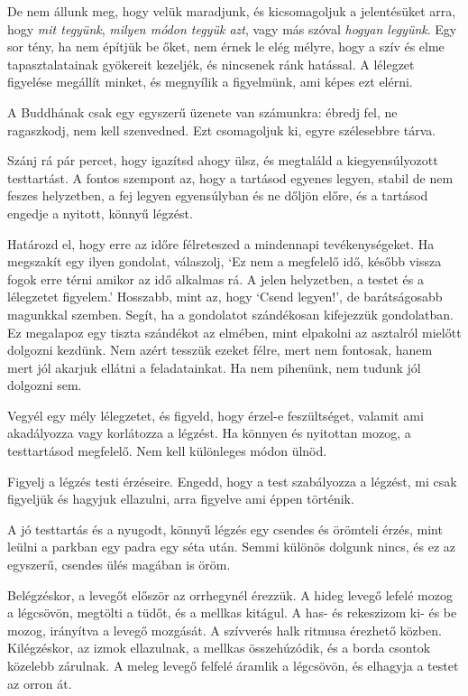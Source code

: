 De nem állunk meg, hogy velük maradjunk, és kicsomagoljuk a jelentésüket
arra, hogy \emph{mit tegyünk}, \emph{milyen módon tegyük azt}, vagy más
szóval \emph{hogyan legyünk}. Egy sor tény, ha nem építjük be őket, nem
érnek le elég mélyre, hogy a szív és elme tapasztalatainak gyökereit
kezeljék, és nincsenek ránk hatással. A lélegzet figyelése megállít
minket, és megnyílik a figyelmünk, ami képes ezt elérni.

A Buddhának csak egy egyszerű üzenete van számunkra: ébredj fel, ne
ragaszkodj, nem kell szenvedned. Ezt csomagoljuk ki, egyre szélesebbre
tárva.

Szánj rá pár percet, hogy igazítsd ahogy ülsz, és megtaláld a
kiegyensúlyozott testtartást. A fontos szempont az, hogy a tartásod
egyenes legyen, stabil de nem feszes helyzetben, a fej legyen
egyensúlyban és ne dőljön előre, és a tartásod engedje a nyitott, könnyű
légzést.

Határozd el, hogy erre az időre félreteszed a mindennapi
tevékenységeket. Ha megszakít egy ilyen gondolat, válaszolj, `Ez nem a
megfelelő idő, később vissza fogok erre térni amikor az idő alkalmas rá.
A jelen helyzetben, a testet és a lélegzetet figyelem.' Hosszabb, mint
az, hogy `Csend legyen!', de barátságosabb magunkkal szemben. Segít, ha
a gondolatot szándékosan kifejezzük gondolatban. Ez megalapoz egy tiszta
szándékot az elmében, mint elpakolni az asztalról mielőtt dolgozni
kezdünk. Nem azért tesszük ezeket félre, mert nem fontosak, hanem mert
jól akarjuk ellátni a feladatainkat. Ha nem pihenünk, nem tudunk jól
dolgozni sem.

Vegyél egy mély lélegzetet, és figyeld, hogy érzel-e feszültséget,
valamit ami akadályozza vagy korlátozza a légzést. Ha könnyen és
nyitottan mozog, a testtartásod megfelelő. Nem kell különleges módon
ülnöd.

Figyelj a légzés testi érzéseire. Engedd, hogy a test szabályozza a
légzést, mi csak figyeljük és hagyjuk ellazulni, arra figyelve ami éppen
történik.

A jó testtartás és a nyugodt, könnyű légzés egy csendes és örömteli
érzés, mint leülni a parkban egy padra egy séta után. Semmi különös
dolgunk nincs, és ez az egyszerű, csendes ülés magában is öröm.

Belégzéskor, a levegőt először az orrhegynél érezzük. A hideg levegő
lefelé mozog a légcsövön, megtölti a tüdőt, és a mellkas kitágul. A has-
és rekeszizom ki- és be mozog, irányítva a levegő mozgását. A szívverés
halk ritmusa érezhető közben. Kilégzéskor, az izmok ellazulnak, a
mellkas összehúzódik, és a borda csontok közelebb zárulnak. A meleg
levegő felfelé áramlik a légcsövön, és elhagyja a testet az orron át.

